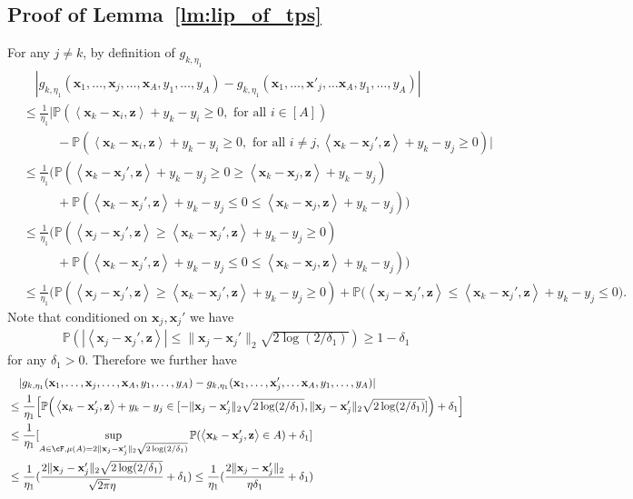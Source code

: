 \documentclass[10pt]{article}
\newcommand{\<}{\left\langle}
\renewcommand{\>}{\right\rangle}
\renewcommand{\P}{\mathbb{P}}
\newcommand{\trunprob}{{\eta_1}}
\newcommand{\Trunregp}{{\eta}}
\def\bx{{\mathbf x}}
\def\bz{{\mathbf z}}
\begin{document}
\subsection{Proof of Lemma~\ref{lm:lip_of_tps}}\label{sec:pf_lm:lip_of_tps}

For any $j\neq k$, by definition of $g_{k,\trunprob}$
\begin{align*}
     &\quad|g_{k,\trunprob}(\bx_1,\ldots,\bx_j,\ldots,\bx_A,y_1,\ldots,y_A)-g_{k,\trunprob}(\bx_1,\ldots,\bx'_j,\ldots\bx_A,y_1,\ldots,y_A)|
        \\
     &\leq
     \frac{1}{\trunprob}\Big|\P(\<\bx_k-\bx_i,\bz\>+y_k-y_i\geq0,\text{~for all~}i\in[A])\\
     &\qquad~~~ -\P(\<\bx_k-\bx_i,\bz\>+y_k-y_i\geq0,\text{~for all~}i\neq j, \<\bx_k-\bx_j',\bz\>+y_k-y_j\geq0)\Big|
     \\
      &\leq
     \frac{1}{\trunprob}\Big(\P( \<\bx_k-\bx_j',\bz\>+y_k-y_j\geq0\geq\<\bx_k-\bx_j,\bz\>+y_k-y_j )\\
     &\qquad~~~
     +\P( \<\bx_k-\bx_j',\bz\>+y_k-y_j\leq0\leq\<\bx_k-\bx_j,\bz\>+y_k-y_j)\Big)\\
     &\leq
      \frac{1}{\trunprob}\Big(\P(\<\bx_j-\bx_j',\bz\>\geq\<\bx_k-\bx_j',\bz\>+y_k-y_j\geq0 )\\&\qquad~~~+\P( \<\bx_k-\bx_j',\bz\>+y_k-y_j\leq0\leq\<\bx_k-\bx_j,\bz\>+y_k-y_j)\Big)\\
       &\leq
      \frac{1}{\trunprob}\Big(\P(\<\bx_j-\bx_j',\bz\>\geq\<\bx_k-\bx_j',\bz\>+y_k-y_j\geq0 )+\P(\<\bx_j-\bx_j',\bz\>\leq \<\bx_k-\bx_j',\bz\>+y_k-y_j\leq0\Big).
\end{align*}
Note that conditioned on $\bx_j,\bx_j'$ we have
\begin{align*}
    \P(|\<\bx_j-\bx_j',\bz\>|\leq \|\bx_j-\bx_j'\|_2\sqrt{2\log(2/{\delta_1})})\geq 1-{\delta_1}
\end{align*} for any ${\delta_1}>0$. Therefore we further have
\begin{align*}
    &\quad|g_{k,\trunprob}(\bx_1,\ldots,\bx_j,\ldots,\bx_A,y_1,\ldots,y_A)-g_{k,\trunprob}(\bx_1,\ldots,\bx'_j,\ldots\bx_A,y_1,\ldots,y_A)|
    \\
    &\leq
     \frac{1}{\trunprob}\Big[\P\Big(\<\bx_k-\bx_j',\bz\>+y_k-y_j\in[-\|\bx_j-\bx_j'\|_2\sqrt{2\log(2/{\delta_1})},\|\bx_j-\bx_j'\|_2\sqrt{2\log(2/{\delta_1})}] \Big)+{\delta_1}\Big]\\
     &\leq
    \frac{1}{\trunprob}[\sup_{A\in\cF,\mu(A)=2\|\bx_j-\bx_j'\|_2\sqrt{2\log(2/{\delta_1})}}\P(\<\bx_k-\bx_j',\bz\>\in A)+{\delta_1}]\\
    &\leq
   \frac{1}{\trunprob}(\frac{2\|\bx_j-\bx_j'\|_2\sqrt{2\log(2/{\delta_1})}}{\sqrt{2\pi}\Trunregp}+{\delta_1})\leq \frac{1}{\trunprob}(\frac{2\|\bx_j-\bx_j'\|_2}{\Trunregp{\delta_1}}+{\delta_1})
\end{align*}
\end{document}
